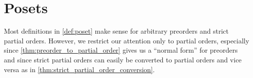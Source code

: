 \section{Posets}\label{sec:posets}

\begin{note}\label{note:only_partial_orders}
  Most definitions in \cref{def:poset} make sense for arbitrary preorders and strict partial orders. However, we restrict our attention only to partial orders, especially since \cref{thm:preorder_to_partial_order} gives us a \enquote{normal form} for preorders and since strict partial orders can easily be converted to partial orders and vice versa as in \cref{thm:strict_partial_order_conversion}.
\end{note}


